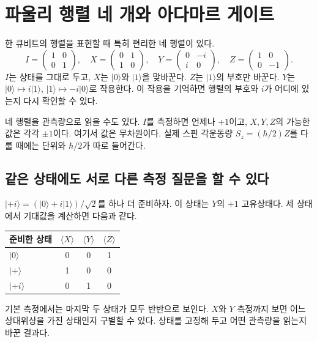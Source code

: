 \section{파울리 행렬 네 개와 아다마르 게이트}

한 큐비트의 행렬을 표현할 때 특히 편리한 네 행렬이 있다.
\[
I=\begin{pmatrix}1&0\\0&1\end{pmatrix},\quad
X=\begin{pmatrix}0&1\\1&0\end{pmatrix},\quad
Y=\begin{pmatrix}0&-i\\i&0\end{pmatrix},\quad
Z=\begin{pmatrix}1&0\\0&-1\end{pmatrix}.
\]
\(I\)는 상태를 그대로 두고, \(X\)는 \(\lvert0\rangle\)와
\(\lvert1\rangle\)을 맞바꾼다. \(Z\)는 \(\lvert1\rangle\)의 부호만 바꾼다.
\(Y\)는 \(\lvert0\rangle\mapsto i\lvert1\rangle\),
\(\lvert1\rangle\mapsto-i\lvert0\rangle\)로 작용한다.
이 작용을 기억하면 행렬의 부호와 \(i\)가 어디에 있는지 다시 확인할 수 있다.


네 행렬을 관측량으로 읽을 수도 있다. \(I\)를 측정하면 언제나 \(+1\)이고,
\(X,Y,Z\)의 가능한 값은 각각 \(\pm1\)이다. 여기서 값은 무차원이다.
실제 스핀 각운동량 \(S_z=(\hbar/2)Z\)를 다룰 때에는 단위와 \(\hbar/2\)가 따로 들어간다.

\subsection{같은 상태에도 서로 다른 측정 질문을 할 수 있다}

\(\lvert+i\rangle=(\lvert0\rangle+i\lvert1\rangle)/\sqrt2\)를 하나 더 준비하자.
이 상태는 \(Y\)의 \(+1\) 고유상태다. 세 상태에서 기대값을 계산하면 다음과 같다.
\begin{center}
\begin{tabular}{lccc}
\toprule
준비한 상태 & \(\langle X\rangle\) & \(\langle Y\rangle\) & \(\langle Z\rangle\)\\
\midrule
\(\lvert0\rangle\) & 0 & 0 & 1\\
\(\lvert+\rangle\) & 1 & 0 & 0\\
\(\lvert+i\rangle\) & 0 & 1 & 0\\
\bottomrule
\end{tabular}
\end{center}
기본 측정에서는 마지막 두 상태가 모두 반반으로 보인다.
\(X\)와 \(Y\) 측정까지 보면 어느 상대위상을 가진 상태인지 구별할 수 있다.
상태를 고정해 두고 어떤 관측량을 읽는지 바꾼 결과다.

